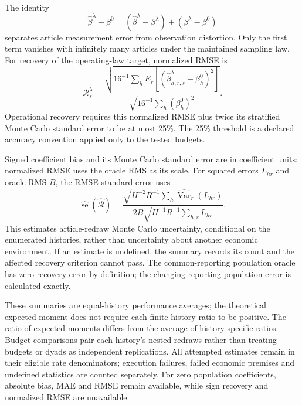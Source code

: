The identity
\begin{equation}\label{eq:recovery-accounting}
  \widehat\beta^\lambda-\beta^0
  =(\widehat\beta^\lambda-\beta^\lambda)+(\beta^\lambda-\beta^0)
\end{equation}
separates article measurement error from observation distortion.
Only the first term vanishes with infinitely many articles under the
maintained sampling law.
For recovery of the operating-law target, normalized RMSE is
\begin{equation}\label{eq:recovery-rmse}
  \mathcal R_s^\lambda=
  \frac{\sqrt{16^{-1}\sum_h E_r[(\widehat\beta_{h,r,s}^\lambda-\beta_h^0)^2]}}
  {\sqrt{16^{-1}\sum_h(\beta_h^0)^2}}.
\end{equation}
Operational recovery requires this normalized RMSE plus twice its stratified
Monte Carlo standard error to be at most 25\%.
The 25\% threshold is a declared accuracy convention applied only to the
tested budgets.

Signed coefficient bias and its Monte Carlo standard error are in
coefficient units; normalized RMSE uses the oracle RMS as its scale.
For squared errors $L_{hr}$ and oracle RMS $B$, the RMSE standard error uses
\begin{equation}\label{eq:recovery-mcse}
  \widehat{\operatorname{se}}(\widehat{\mathcal R})=
  \frac{\sqrt{H^{-2}R^{-1}\sum_h\widehat{\operatorname{Var}}_r(L_{hr})}}
  {2B\sqrt{H^{-1}R^{-1}\sum_{h,r}L_{hr}}}.
\end{equation}
This estimates article-redraw Monte Carlo uncertainty, conditional on the
enumerated histories, rather than uncertainty about another economic
environment.
If an estimate is undefined, the summary records its count and the affected
recovery criterion cannot pass.
The common-reporting population oracle has zero recovery error by definition;
the changing-reporting population error is calculated exactly.

These summaries are equal-history performance averages; the theoretical expected
moment does not require each finite-history ratio to be positive.
The ratio of expected moments differs from the average of history-specific ratios.
Budget comparisons pair each history's nested redraws rather than treating
budgets or dyads as independent replications.
All attempted estimates remain in their eligible rate denominators;
execution failures, failed economic premises and undefined statistics are
counted separately.
For zero population coefficients, absolute bias, MAE and RMSE remain
available, while sign recovery and normalized RMSE are unavailable.

